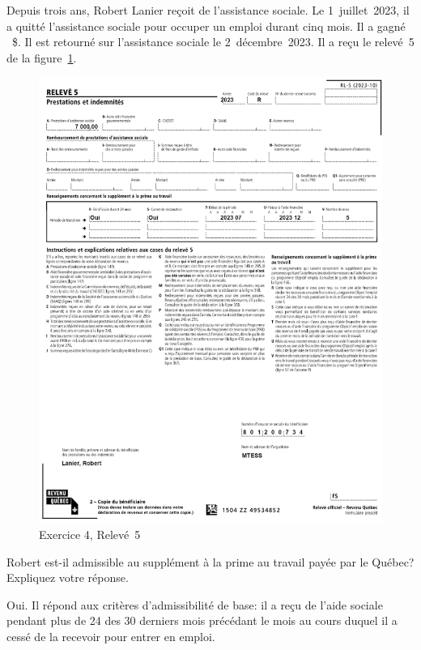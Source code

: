 \begin{question}
	Depuis trois ans, Robert Lanier reçoit de l'assistance sociale. Le 1\ier{}~juillet~2023, il a quitté l'assistance sociale pour occuper un emploi durant cinq mois. Il a gagné ~\$. Il est retourné sur l'assistance sociale le 2~décembre~2023. Il a reçu le relevé~5 de la 
	figure~\ref{fig:chap7Exercice4RL5}.
	\begin{figure}
		\centering
		\includegraphics[width=.9\textwidth]{exercice/7-4/Q3/RL5.png}
		\caption[]{Exercice 4, Relevé~5}
		\label{fig:chap7Exercice4RL5}
	\end{figure}
\end{question}
\setcounter{sousQuestion}{0}
\begin{sousQuestion}
	Robert est-il admissible au supplément à la prime au travail payée par le Québec? Expliquez votre réponse.
\end{sousQuestion}
Oui. Il répond aux critères d'admissibilité de base: il a reçu de l'aide sociale pendant plus de 24 des 30 derniers mois précédant le mois au cours duquel il a cessé de la recevoir pour entrer en emploi.

